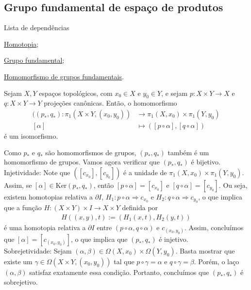 \subsection{Grupo fundamental de espaço de produtos}
\label{grupo-fundamental-de-espaco-de-produtos-prop}
\begin{titlemize}{Lista de dependências}
    \item \hyperref[homotopia-def]{Homotopia};\\
    \item \hyperref[grupo-fundamental]{Grupo fundamental};\\
    \item \hyperref[hom-grupo-fundamental]{Homomorfismo de grupos fundamentais}.
\end{titlemize}

\begin{prop}
    Sejam $X,Y$ espaços topológicos, com $x_0\in X$ e $y_0\in Y$, e sejam $p:X\times Y\rightarrow X$ e $q:X\times Y\rightarrow Y$ projeções canônicas. Então, o homomorfismo
    \begin{align*}
        ((p_*,q_*):\pi_1(X\times Y,(x_0,y_0))&\longrightarrow \pi_1 (X,x_0)\times \pi_1(Y,y_0)\\
        [\alpha]&\longmapsto ([p\circ \alpha],[q\circ \alpha]) 
    \end{align*}
    é um isomorfismo.
\end{prop}

\begin{dem}
    Como $p_*$ e $q_*$ são homomorfismos de grupos, $(p_*,q_*)$ também é um homomorfismo de grupos. Vamos agora verificar que $(p_*,q_*)$ é bijetivo.\\
    Injetividade: Note que $([c_{x_0}],[c_{y_0}])$ é a unidade de $\pi_1 (X,x_0)\times \pi_1(Y,y_0)$. Assim, se $[\alpha]\in \text{Ker}(p_*,q_*)$, então $[p\circ \alpha]=[c_{x_0}]$ e $[q\circ \alpha]=[c_{y_0}]$. Ou seja, existem homotopias relativa a $\partial I$, $H_1:p\circ\alpha \Rightarrow c_{x_0}$ e $H_2:q\circ \alpha \Rightarrow c_{y_0}$, o que implica que a função $H:(X\times Y)\times I\rightarrow X\times Y$ definida por
    \begin{align*}
        H((x,y),t):=(H_1(x,t),H_2(y,t))
    \end{align*}
    é uma homotopia relativa a $\partial I$ entre $(p\circ \alpha,q\circ\alpha)$ e $c_{(x_0,y_0)}$. Assim, concluímos que $[\alpha]=[c_{(x_0,y_0)}]$, o que implica que $(p_*,q_*)$ é injetivo.\\
    Sobrejetividade: Sejam $(\alpha,\beta)\in \Omega(X,x_0)\times \Omega(Y,y_0)$. Basta mostrar que existe um $\gamma\in \Omega(X\times Y,(x_0,y_0))$ tal que $p\circ\gamma=\alpha$ e $q\circ \gamma=\beta$. Porém, o laço $(\alpha,\beta)$ satisfaz exatamente essa condição. Portanto, concluímos que $(p_*,q_*)$ é sobrejetivo.
\end{dem}
